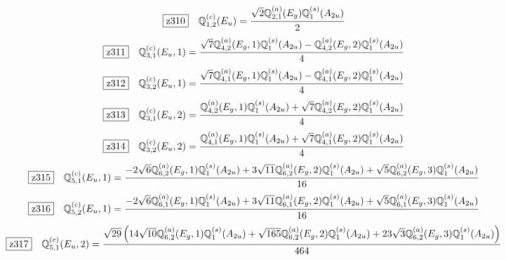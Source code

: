 \documentclass[fleqn,10pt,landscape]{jsarticle}
\begin{document}
\begin{dmath*}
\hspace*{3mm}\fbox{z310}\quad \mathbb{Q}_{1,2}^{(c)}(E_{u})=\frac{\sqrt{2} \mathbb{Q}_{2,1}^{(a)}(E_{g}) \mathbb{Q}_{1}^{(s)}(A_{2u})}{2}
\end{dmath*}
\begin{dmath*}
\hspace*{3mm}\fbox{z311}\quad \mathbb{Q}_{3,1}^{(c)}(E_{u},1)=\frac{\sqrt{7} \mathbb{Q}_{4,2}^{(a)}(E_{g},1) \mathbb{Q}_{1}^{(s)}(A_{2u}) - \mathbb{Q}_{4,2}^{(a)}(E_{g},2) \mathbb{Q}_{1}^{(s)}(A_{2u})}{4}
\end{dmath*}
\begin{dmath*}
\hspace*{3mm}\fbox{z312}\quad \mathbb{Q}_{3,2}^{(c)}(E_{u},1)=\frac{\sqrt{7} \mathbb{Q}_{4,1}^{(a)}(E_{g},1) \mathbb{Q}_{1}^{(s)}(A_{2u}) - \mathbb{Q}_{4,1}^{(a)}(E_{g},2) \mathbb{Q}_{1}^{(s)}(A_{2u})}{4}
\end{dmath*}
\begin{dmath*}
\hspace*{3mm}\fbox{z313}\quad \mathbb{Q}_{3,1}^{(c)}(E_{u},2)=\frac{\mathbb{Q}_{4,2}^{(a)}(E_{g},1) \mathbb{Q}_{1}^{(s)}(A_{2u}) + \sqrt{7} \mathbb{Q}_{4,2}^{(a)}(E_{g},2) \mathbb{Q}_{1}^{(s)}(A_{2u})}{4}
\end{dmath*}
\begin{dmath*}
\hspace*{3mm}\fbox{z314}\quad \mathbb{Q}_{3,2}^{(c)}(E_{u},2)=\frac{\mathbb{Q}_{4,1}^{(a)}(E_{g},1) \mathbb{Q}_{1}^{(s)}(A_{2u}) + \sqrt{7} \mathbb{Q}_{4,1}^{(a)}(E_{g},2) \mathbb{Q}_{1}^{(s)}(A_{2u})}{4}
\end{dmath*}
\begin{dmath*}
\hspace*{3mm}\fbox{z315}\quad \mathbb{Q}_{5,1}^{(c)}(E_{u},1)=\frac{- 2 \sqrt{6} \mathbb{Q}_{6,2}^{(a)}(E_{g},1) \mathbb{Q}_{1}^{(s)}(A_{2u}) + 3 \sqrt{11} \mathbb{Q}_{6,2}^{(a)}(E_{g},2) \mathbb{Q}_{1}^{(s)}(A_{2u}) + \sqrt{5} \mathbb{Q}_{6,2}^{(a)}(E_{g},3) \mathbb{Q}_{1}^{(s)}(A_{2u})}{16}
\end{dmath*}
\begin{dmath*}
\hspace*{3mm}\fbox{z316}\quad \mathbb{Q}_{5,2}^{(c)}(E_{u},1)=\frac{- 2 \sqrt{6} \mathbb{Q}_{6,1}^{(a)}(E_{g},1) \mathbb{Q}_{1}^{(s)}(A_{2u}) + 3 \sqrt{11} \mathbb{Q}_{6,1}^{(a)}(E_{g},2) \mathbb{Q}_{1}^{(s)}(A_{2u}) + \sqrt{5} \mathbb{Q}_{6,1}^{(a)}(E_{g},3) \mathbb{Q}_{1}^{(s)}(A_{2u})}{16}
\end{dmath*}
\begin{dmath*}
\hspace*{3mm}\fbox{z317}\quad \mathbb{Q}_{5,1}^{(c)}(E_{u},2)=\frac{\sqrt{29} \left(14 \sqrt{10} \mathbb{Q}_{6,2}^{(a)}(E_{g},1) \mathbb{Q}_{1}^{(s)}(A_{2u}) + \sqrt{165} \mathbb{Q}_{6,2}^{(a)}(E_{g},2) \mathbb{Q}_{1}^{(s)}(A_{2u}) + 23 \sqrt{3} \mathbb{Q}_{6,2}^{(a)}(E_{g},3) \mathbb{Q}_{1}^{(s)}(A_{2u})\right)}{464}
\end{dmath*}
\end{document}
